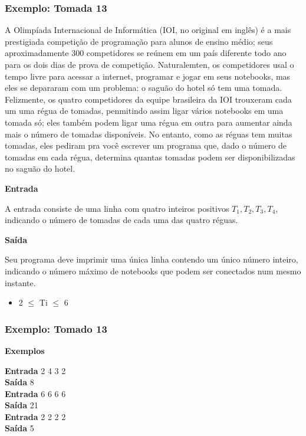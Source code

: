 \begin{frame}
  \frametitle{Exemplo: Tomada 13}
  \scriptsize A Olimpíada Internacional de Informática (IOI, no original em inglês) é a mais prestigiada competição de programação para alunos de ensino médio; seus aproximadamente 300 competidores se reúnem em um país diferente todo ano para os dois dias de prova de competição. Naturalemten, os competidores usal o tempo livre para  acessar a internet, programar e jogar em seus notebooks, mas eles se depararam com um problema: o saguão do hotel só tem uma tomada.\\
  \scriptsize Felizmente, os quatro competidores da equipe brasileira da IOI trouxeram cada um uma régua de tomadas, penmitindo assim ligar vários notebooks em uma tomada só; eles também podem ligar uma régua em outra para aumentar ainda mais o número de tomadas disponíveis. No entanto, como as réguas tem muitas tomadas, eles pediram pra você escrever um programa que, dado o número de tomadas em cada régua, determina quantas tomadas podem ser disponibilizadas no saguão do hotel.\\
  \begin{center}
    \textbf{Entrada}
  \end{center}
  \scriptsize A entrada consiste de uma linha com quatro inteiros positivos \begin{math}T_1, T_2, T_3, T_4\end{math}, indicando o número de tomadas de cada uma das quatro réguas.
  \begin{center}
    \textbf{Saída}
  \end{center}
  \scriptsize Seu programa deve imprimir uma única linha contendo um único número inteiro, indicando o número máximo de notebooks que podem ser conectados num mesmo instante.
  \begin{itemize}
    \item 2 $\leq$ Ti $\leq$ 6
  \end{itemize}
\end{frame}

\begin{frame}
  \frametitle{Exemplo: Tomado 13}
  \begin{center}
    \textbf{Exemplos}
  \end{center}
  \textbf{Entrada}
    2	4	3	2\\
  \textbf{Saída}
    8\\
  \textbf{Entrada}
    6	6	6	6\\
  \textbf{Saída}
    21\\
  \textbf{Entrada}
    2	2	2	2\\
  \textbf{Saída}
    5
\end{frame}